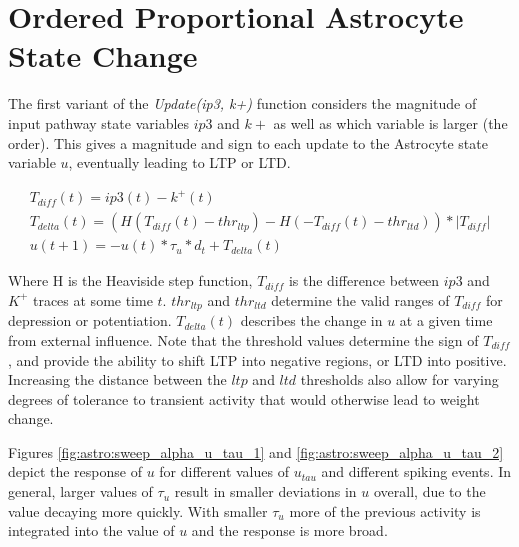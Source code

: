     
    \section{Ordered Proportional Astrocyte State Change}

    The first variant of the \emph{Update(ip3, k+)} function considers the
    magnitude of input pathway state variables $ip3$ and $k+$ as well as which
    variable is larger (the order). This gives a magnitude and sign to each
    update to the Astrocyte state variable $u$, eventually leading to LTP or
    LTD.

    \begin{align}
      T_{diff}(t) = ip3(t) - k^+(t) \\
      T_{delta}(t) = (H(T_{diff}(t) - thr_{ltp}) - H(-T_{diff}(t) - thr_{ltd})) * |T_{diff}| \\
      u(t+1) = -u(t) * \tau_{u} * d_t + T_{delta}(t) \label{eq:astro:rate-u}
    \end{align}

    Where H is the Heaviside step function, $T_{diff}$ is the difference between
    $ip3$ and $K^+$ traces at some time $t$. $thr_{ltp}$ and $thr_{ltd}$ determine the valid
    ranges of $T_{diff}$ for depression or potentiation. $T_{delta}(t)$ describes
    the change in $u$ at a given time from external influence. Note that the
    threshold values determine the sign of $T_{diff}$, and provide the ability
    to shift LTP into negative regions, or LTD into positive. Increasing the
    distance between the $ltp$ and $ltd$ thresholds also allow for varying
    degrees of tolerance to transient activity that would otherwise lead to
    weight change.



    Figures \ref{fig:astro:sweep_alpha_u_tau_1} and
    \ref{fig:astro:sweep_alpha_u_tau_2} depict the response of $u$ for
    different values of $u_{tau}$ and different spiking events. In general,
    larger values of $\tau_u$ result in smaller deviations in $u$ overall, due
    to the value decaying more quickly. With smaller $\tau_u$ more of the
    previous activity is integrated into the value of $u$ and the response is
    more broad.

